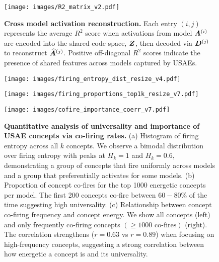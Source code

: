 \begin{figure}
    \centering
    \texttt{[image: images/R2\_matrix\_v2.pdf]}
    \vspace{-0.43cm}
    \caption{\textbf{Cross model activation reconstruction.} 
    Each entry \((i, j)\) represents the average \( R^2 \) score when activations from model \( \bm{A}^{(i)} \) are encoded into the shared code space, \( \bm{Z} \), then decoded via \( \bm{D}^{(j)} \) to reconstruct \( \widehat{\bm{A}}^{(j)} \). Positive off-diagonal \( R^2 \) scores indicate the presence of shared features across models captured by USAEs.}
      \vspace{-20pt}
    \label{fig:R2matrix}
  
\end{figure}



\begin{figure}
    \begin{minipage}{0.49\linewidth}  %
    \centering
    \texttt{[image: images/firing\_entropy\_dist\_resize\_v4.pdf]}
    \end{minipage}
        \begin{minipage}{0.499\linewidth}  %
    \centering
    \texttt{[image: images/firing\_proportions\_top1k\_resize\_v7.pdf]}
    \end{minipage}
    \begin{minipage}{1\linewidth}  %
    \centering
    \texttt{[image: images/cofire\_importance\_coerr\_v7.pdf]}
    \end{minipage}
    \vspace{-15pt}
    \caption{\textbf{Quantitative analysis of universality and importance of USAE concepts via co-firing rates.}
    (a) Histogram of firing entropy across all $k$ concepts. We observe a bimodal distribution over firing entropy with peaks at $H_k = 1$ and $H_k = 0.6$, demonstrating a group of concepts that fire uniformly across models and a group that preferentially activates for some models.
    (b) Proportion of concept co-fires for the top 1000 energetic concepts per model. The first 200 concepts co-fire between $60-80\%$ of the time suggesting high universality. 
    (c) Relationship between concept co-firing frequency and concept energy. We show all concepts (left) and only frequently co-firing concepts $(\geq 1000 \text{ co-fires})$ (right). The correlation strengthens ($r=0.63$ vs $r=0.89$) when focusing on high-frequency concepts, suggesting a strong correlation between how energetic a concept is and its universality.}
    \vspace{-6mm}
    \label{fig:quant_entropy}
\end{figure}




